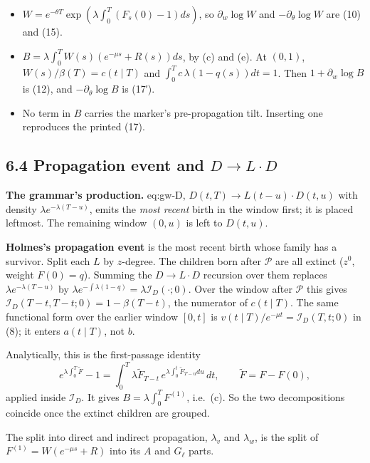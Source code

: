 \documentclass[10pt,]{article}
\providecommand{\tightlist}{%
  \setlength{\itemsep}{0pt}\setlength{\parskip}{0pt}}
\begin{document}
\begin{itemize}
\tightlist
\item
  \(W=e^{-\theta T}\exp(\lambda\int_0^T(F_s(0)-1)ds)\), so
  \(\partial_w\log W\) and \(-\partial_\theta\log W\) are (10) and (15).
\item
  \(B=\lambda\int_0^TW(s)(e^{-\mu s}+R(s))ds\), by (c) and (e). At
  \((0,1)\), \(W(s)/\beta(T)=c(t\mid T)\) and
  \(\int_0^Tc\,\lambda(1-q(s))dt=1\). Then \(1+\partial_w\log B\) is
  (12), and \(-\partial_\theta\log B\) is (17′).
\item
  No term in \(B\) carries the marker's pre-propagation tilt. Inserting
  one reproduces the printed (17).
\end{itemize}

\hypertarget{propagation-event-and-dto-lcdot-d}{%
\subsection{\texorpdfstring{6.4 Propagation event and
\(D\to L\cdot D\)}{6.4 Propagation event and D\textbackslash{}to L\textbackslash{}cdot D}}\label{propagation-event-and-dto-lcdot-d}}

\textbf{The grammar's production.} eq:gw-D,
\(D(t,T)\to L(t-u)\cdot D(t,u)\) with density
\(\lambda e^{-\lambda(T-u)}\), emits the \emph{most recent} birth in the
window first; it is placed leftmost. The remaining window \((0,u)\) is
left to \(D(t,u)\).

\textbf{Holmes's propagation event} is the most recent birth whose
family has a survivor. Split each \(L\) by \(z\)-degree. The children
born after \(\mathcal P\) are all extinct (\(z^0\), weight \(F(0)=q\)).
Summing the \(D\to L\cdot D\) recursion over them replaces
\(\lambda e^{-\lambda(T-u)}\) by
\(\lambda e^{-\int\lambda(1-q)}=\lambda\mathcal I_D(\cdot;0)\). Over the
window after \(\mathcal P\) this gives
\(\mathcal I_D(T-t,T-t;0)=1-\beta(T-t)\), the numerator of
\(c(t\mid T)\). The same functional form over the earlier window
\([0,t]\) is \(v(t\mid T)/e^{-\mu t}=\mathcal I_D(T,t;0)\) in (8); it
enters \(a(t\mid T)\), not \(b\).

Analytically, this is the first-passage identity
\[e^{\lambda\int_0^T\tilde F}-1=\int_0^T\lambda\tilde F_{T-t}\,e^{\lambda\int_0^t\tilde F_{T-u}du}\,dt,\qquad \tilde F=F-F(0),\]
applied inside \(\mathcal I_D\). It gives \(B=\lambda\int_0^TF^{(1)}\),
i.e.~(c). So the two decompositions coincide once the extinct children
are grouped.

The split into direct and indirect propagation, \(\lambda_v\) and
\(\lambda_w\), is the split of \(F^{(1)}=W(e^{-\mu s}+R)\) into its
\(A\) and \(G_\ell\) parts.
\end{document}
